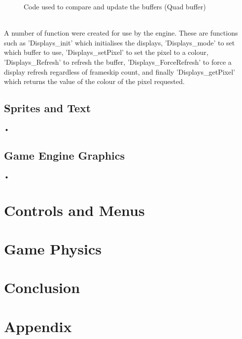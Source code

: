 \documentclass[a4paper,12pt]{article}
\begin{document}
\begin{flushleft}
\begin{figure}[H]
	\centering
	
		\caption{Code used to compare and update the buffers (Quad buffer)}
\end{figure}
\- \\
A number of function were created for use by the engine. These are functions such as 'Displays\_init' which initialises the displays, 'Displays\_mode' to set which buffer to use, 'Displays\_setPixel' to set the pixel to a colour, 'Displays\_Refresh' to refresh the buffer, 'Displays\_ForceRefresh' to force a display refresh regardless of frameskip count, and finally 'Displays\_getPixel' which returns the value of the colour of the pixel requested.
\end{flushleft}
\newpage
\subsection{Sprites and Text}
\begin{flushleft}
•
\end{flushleft}
\newpage
\subsection{Game Engine Graphics}
\begin{flushleft}
•
\end{flushleft}
\newpage
\section{Controls and Menus}
\newpage
\section{Game Physics}
\newpage
\section{Conclusion}
\begin{flushleft}

\end{flushleft}
\newpage
\section{Appendix}
\newpage
{}
\begin{flushleft}

\end{flushleft}
\end{document}

